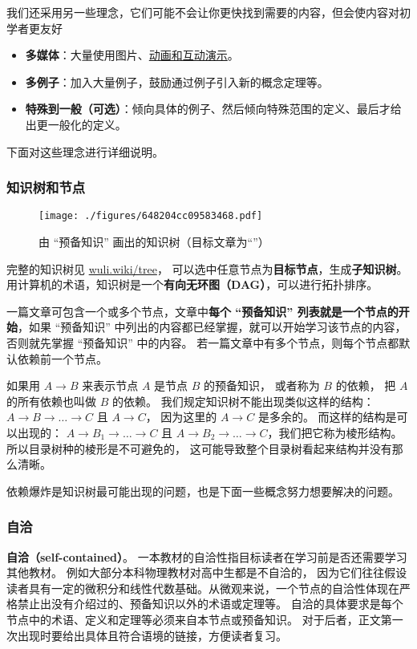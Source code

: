 我们还采用另一些理念，它们可能不会让你更快找到需要的内容，但会使内容对初学者更友好
\begin{itemize}
\item \textbf{多媒体}：大量使用图片、\href{https://wuli.wiki/apps/}{动画和互动演示}。
\item \textbf{多例子}：加入大量例子，鼓励通过例子引入新的概念定理等。
\item \textbf{特殊到一般（可选）}：倾向具体的例子、然后倾向特殊范围的定义、最后才给出更一般化的定义。
\end{itemize}
下面对这些理念进行详细说明。


\subsubsection{知识树和节点}
\begin{figure}[ht]
\centering
\texttt{[image: ./figures/648204cc09583468.pdf]}
\caption{由 “预备知识” 画出的知识树（目标文章为“”）}\label{fig_about_1}
\end{figure}

完整的知识树见 \href{https://wuli.wiki/tree}{wuli.wiki/tree}， 可以选中任意节点为\textbf{目标节点}，生成\textbf{子知识树}。 用计算机的术语，知识树是一个\textbf{有向无环图（DAG）}，可以进行拓扑排序。 %

一篇文章可包含一个或多个节点，文章中\textbf{每个 “预备知识” 列表就是一个节点的开始}，如果 “预备知识” 中列出的内容都已经掌握，就可以开始学习该节点的内容，否则就先掌握 “预备知识” 中的内容。 若一篇文章中有多个节点，则每个节点都默认依赖前一个节点。

如果用 $A\to B$ 来表示节点 $A$ 是节点 $B$ 的预备知识， 或者称为 $B$ 的依赖， 把 $A$ 的所有依赖也叫做 $B$ 的依赖。 我们规定知识树不能出现类似这样的结构： $A \to B \to \dots \to C$ 且 $A \to C$， 因为这里的 $A \to C$ 是多余的。 而这样的结构是可以出现的： $A \to B_1 \to \dots \to C$ 且 $A \to B_2 \to \dots \to C$，我们把它称为棱形结构。 所以目录树种的棱形是不可避免的， 这可能导致整个目录树看起来结构并没有那么清晰。

依赖爆炸是知识树最可能出现的问题，也是下面一些概念努力想要解决的问题。

\subsubsection{自洽}
\textbf{自洽（self-contained）}。 一本教材的自洽性指目标读者在学习前是否还需要学习其他教材。 例如大部分本科物理教材对高中生都是不自洽的， 因为它们往往假设读者具有一定的微积分和线性代数基础。从微观来说，一个节点的自洽性体现在严格禁止出没有介绍过的、预备知识以外的术语或定理等。 自洽的具体要求是每个节点中的术语、定义和定理等必须来自本节点或预备知识。 对于后者，正文第一次出现时要给出具体且符合语境的链接，方便读者复习。


